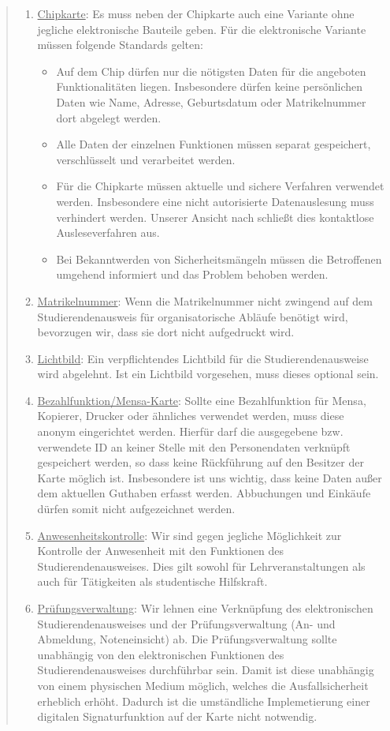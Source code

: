 \documentclass[10pt,oneside]{scrartcl}
\begin{document}
\begin{quote}
  \begin{enumerate}
  \item{\underline{Chipkarte}: Es muss neben der Chipkarte auch eine Variante ohne jegliche elektronische Bauteile geben. 
  Für die elektronische Variante müssen folgende Standards gelten:}
    \begin{itemize}
      \item{Auf dem Chip dürfen nur die nötigsten Daten für die angeboten Funktionalitäten liegen. 
      Insbesondere dürfen keine persönlichen Daten wie Name, Adresse,  Geburtsdatum oder Matrikelnummer dort abgelegt werden.}
      \item{Alle Daten der einzelnen Funktionen müssen separat gespeichert, verschlüsselt und verarbeitet werden.}
      \item{Für die Chipkarte müssen aktuelle und sichere Verfahren verwendet werden. 
      Insbesondere eine nicht autorisierte Datenauslesung muss verhindert werden. Unserer Ansicht nach schließt dies kontaktlose Ausleseverfahren aus.} 
      \item{Bei Bekanntwerden von Sicherheitsmängeln müssen die Betroffenen umgehend informiert und das Problem behoben werden.}
  \end{itemize}
  \item{\underline{Matrikelnummer}: Wenn die Matrikelnummer nicht zwingend  auf dem Studierendenausweis für organisatorische Abläufe benötigt wird, bevorzugen wir, dass sie dort nicht aufgedruckt wird.}
  \item{\underline{Lichtbild}: Ein verpflichtendes Lichtbild für die Studierendenausweise wird abgelehnt. Ist ein Lichtbild vorgesehen, muss dieses optional sein.}
  \item{\underline{Bezahlfunktion/Mensa-Karte}:  Sollte eine Bezahlfunktion für Mensa, Kopierer, Drucker oder ähnliches verwendet werden, 
  muss diese anonym eingerichtet werden. Hierfür darf die ausgegebene bzw. verwendete ID an keiner Stelle mit den Personendaten verknüpft gespeichert werden, 
  so dass keine Rückführung auf den Besitzer der Karte möglich ist. 
  Insbesondere ist uns wichtig, dass keine Daten außer dem aktuellen Guthaben erfasst werden. Abbuchungen und Einkäufe dürfen somit nicht aufgezeichnet werden.}
  \item{\underline{Anwesenheitskontrolle}: Wir sind gegen jegliche Möglichkeit zur Kontrolle der Anwesenheit mit den Funktionen des Studierendenausweises. Dies gilt sowohl für Lehrveranstaltungen als auch für Tätigkeiten als studentische Hilfskraft. }
  \item{\underline{Prüfungsverwaltung}: Wir lehnen eine Verknüpfung des elektronischen Studierendenausweises und der Prüfungsverwaltung (An- und Abmeldung, Noteneinsicht) ab. Die Prüfungsverwaltung sollte unabhängig von den elektronischen Funktionen des Studierendenausweises durchführbar sein. Damit ist diese unabhängig von einem physischen Medium möglich, welches die Ausfallsicherheit erheblich erhöht. Dadurch ist die umständliche Implemetierung einer digitalen Signaturfunktion auf der Karte nicht notwendig.}

\end{enumerate}
\end{quote}
\end{document}
